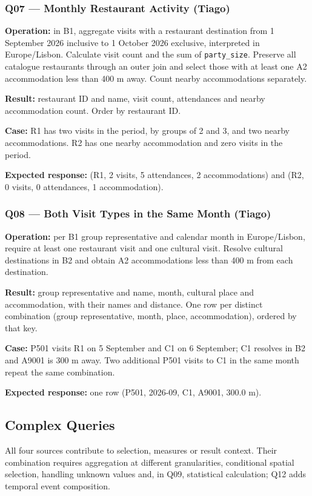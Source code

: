 \subsubsection{Q07 --- Monthly Restaurant Activity (Tiago)}
\textbf{Operation:} in B1, aggregate visits with a restaurant destination from 1 September 2026 inclusive to 1 October 2026 exclusive, interpreted in Europe/Lisbon. Calculate visit count and the sum of \texttt{party\_\allowbreak{}size}. Preserve all catalogue restaurants through an outer join and select those with at least one A2 accommodation less than 400 m away. Count nearby accommodations separately.\par
\textbf{Result:} restaurant ID and name, visit count, attendances and nearby accommodation count. Order by restaurant ID.\par
\textbf{Case:} R1 has two visits in the period, by groups of 2 and 3, and two nearby accommodations. R2 has one nearby accommodation and zero visits in the period.\par
\textbf{Expected response:} (R1, 2 visits, 5 attendances, 2 accommodations) and (R2, 0 visits, 0 attendances, 1 accommodation).
\subsubsection{Q08 --- Both Visit Types in the Same Month (Tiago)}
\textbf{Operation:} per B1 group representative and calendar month in Europe/Lisbon, require at least one restaurant visit and one cultural visit. Resolve cultural destinations in B2 and obtain A2 accommodations less than 400 m from each destination.\par
\textbf{Result:} group representative and name, month, cultural place and accommodation, with their names and distance. One row per distinct combination (group representative, month, place, accommodation), ordered by that key.\par
\textbf{Case:} P501 visits R1 on 5 September and C1 on 6 September; C1 resolves in B2 and A9001 is 300 m away. Two additional P501 visits to C1 in the same month repeat the same combination.\par
\textbf{Expected response:} one row (P501, 2026-09, C1, A9001, 300.0 m).
\subsection{Complex Queries}
All four sources contribute to selection, measures or result context. Their combination requires aggregation at different granularities, conditional spatial selection, handling unknown values and, in Q09, statistical calculation; Q12 adds temporal event composition.
